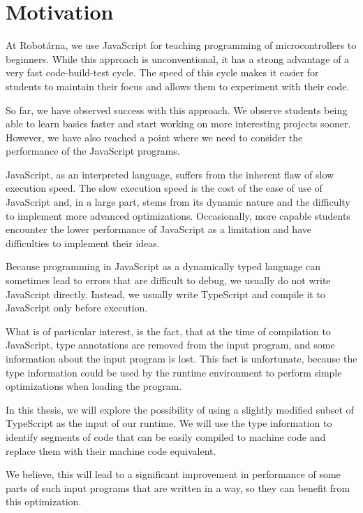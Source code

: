 \chapter{Motivation}

At Robotárna, we use JavaScript for teaching programming of microcontrollers to beginners. While this approach is unconventional, it has a strong advantage of a very fast code-build-test cycle. The speed of this cycle makes it easier for students to maintain their focus and allows them to experiment with their code.

So far, we have observed success with this approach. We observe students being able to learn basics faster and start working on more interesting projects sooner. However, we have also reached a point where we need to consider the performance of the JavaScript programs.

JavaScript, as an interpreted language, suffers from the inherent flaw of slow execution speed. The slow execution speed is the cost of the ease of use of JavaScript and, in a large part, stems from its dynamic nature and the difficulty to implement more advanced optimizations. Occasionally, more capable students encounter the lower performance of JavaScript as a limitation and have difficulties to implement their ideas.

Because programming in JavaScript as a dynamically typed language can sometimes lead to errors that are difficult to debug, we usually do not write JavaScript directly. Instead, we usually write TypeScript and compile it to JavaScript only before execution.

What is of particular interest, is the fact, that at the time of compilation to JavaScript, type annotations are removed from the input program, and some information about the input program is lost. This fact is unfortunate, because the type information could be used by the runtime environment to perform simple optimizations when loading the program.

In this thesis, we will explore the possibility of using a slightly modified subset of TypeScript as the input of our runtime. We will use the type information to identify segments of code that can be easily compiled to machine code and replace them with their machine code equivalent.


We believe, this will lead to a significant improvement in performance of some parts of such input programs that are written in a way, so they can benefit from this optimization.
